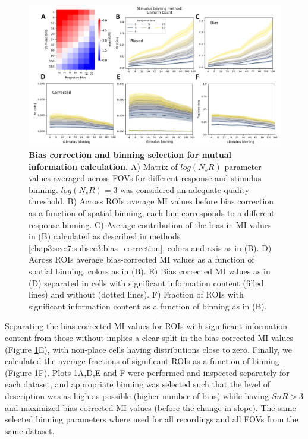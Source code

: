 \begin{figure}[h]
    \centering
    \includegraphics[trim={0 0 0 0},clip,width=\textwidth]{Figures/Chapter4/bias_correction_2p.pdf}
    \caption[Bias correction and binning selection for mutual information calculation]{\textbf{Bias correction and binning selection for mutual information calculation.} 
    A) Matrix of $log(N_sR)$ parameter values averaged across FOVs for different response and stimulus binning. 
    $log(N_sR)=3$ was considered an adequate quality threshold.
    B) Across ROIs average MI values before bias correction as a function of spatial binning, each line corresponds to a different response binning.
    C) Average contribution of the bias in MI values in (B) calculated as described in methods \ref{chap3:sec:7:subsec3:bias_correction}, colors and axis as in (B).
    D) Across ROIs average bias-corrected MI values as a function of spatial binning, colors as in (B). 
    E) Bias corrected MI values as in (D) separated in cells with significant information content (filled lines) and without (dotted lines). 
    F) Fraction of ROIs with significant information content as a function of binning as in (B).}
    \label{fig:chap4:bias_corr_2p}
\end{figure}
Separating the bias-corrected MI values for ROIs with significant information content from those without implies a clear split in the bias-corrected MI values (Figure \ref{fig:chap4:bias_corr_2p}E), with non-place cells having distributions close to zero. 
Finally, we calculated the average fractions of significant ROIs as a function of binning (Figure \ref{fig:chap4:bias_corr_2p}F).
Plots \ref{fig:chap4:bias_corr_2p}A,D,E and F were performed and inspected separately for each dataset, and appropriate binning was selected such that the level of description was as high as possible (higher number of bins) while having $SnR>3$ and maximized bias corrected MI values (before the change in slope).
The same selected binning parameters where used for all recordings and all FOVs from the same dataset.

